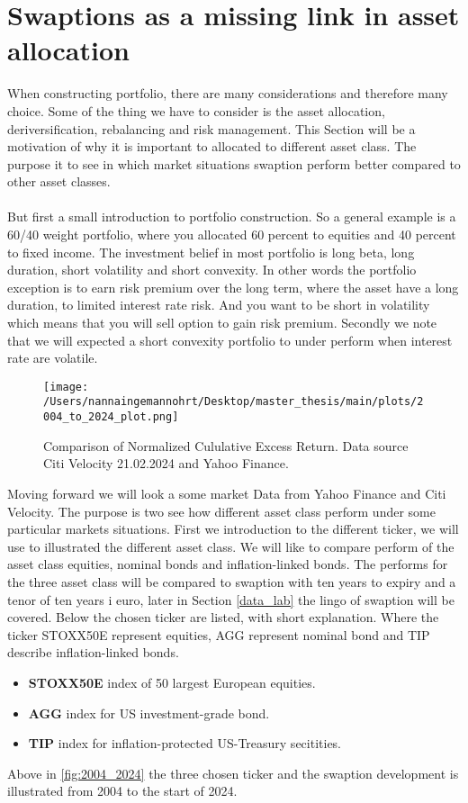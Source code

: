 \section{Swaptions as a missing link in asset allocation}
When constructing portfolio, there are many considerations and therefore many choice. 
Some of the thing we have to consider is the asset allocation, deriversification, rebalancing 
and risk management. This Section will be a motivation of why it is important to 
allocated to different asset class. The purpose it to see in which market situations
swaption perform better compared to other asset classes.
\\\\
But first a small introduction to portfolio construction. 
So a general  example is a 60/40 weight portfolio, where you allocated 60 percent to equities 
and 40 percent to fixed income. 
The investment belief in most portfolio is long beta, long duration, short volatility and short 
convexity. In other words the portfolio exception is to earn risk premium over the long term, 
where the asset have a long duration, to limited interest rate risk. And you want to be short in
volatility which means that you will sell option to gain risk premium. Secondly we note that we will expected 
a short convexity portfolio to under perform when interest rate are volatile. 
\begin{figure}[H]
    \centering
    \texttt{[image: /Users/nannaingemannohrt/Desktop/master\_thesis/main/plots/2004\_to\_2024\_plot.png]}
    \caption{Comparison of Normalized Cululative Excess Return. Data source Citi Velocity 21.02.2024 
    and Yahoo Finance.}
    \label{fig:2004_2024}
\end{figure}
\noindent
Moving forward we will look a some market Data from Yahoo Finance and Citi Velocity. 
The purpose is two see how different asset class perform under some particular markets situations.
First we introduction to the different ticker, we will use to illustrated the different asset class. 
We will like to compare perform of the asset class equities, nominal bonds and inflation-linked bonds. 
The performs for the three asset class will be compared to swaption with ten years to expiry and a tenor
of ten years i euro, later in Section \ref{data_lab} the lingo of swaption will be covered. 
Below the chosen ticker are listed, with short explanation. Where the ticker STOXX50E represent equities, 
AGG represent nominal bond and TIP describe inflation-linked bonds.

\begin{itemize}
    \item \textbf{STOXX50E} \text{---}  index of 50 largest European equities.
    \item \textbf{AGG} \text{---}  index for US investment-grade bond. 
    \item \textbf{TIP} \text{---}  index for inflation-protected US-Treasury secitities.
    \end{itemize}
\noindent
Above in \autoref{fig:2004_2024} the three chosen ticker and the swaption development
is illustrated from 2004 to the start of 2024. 


